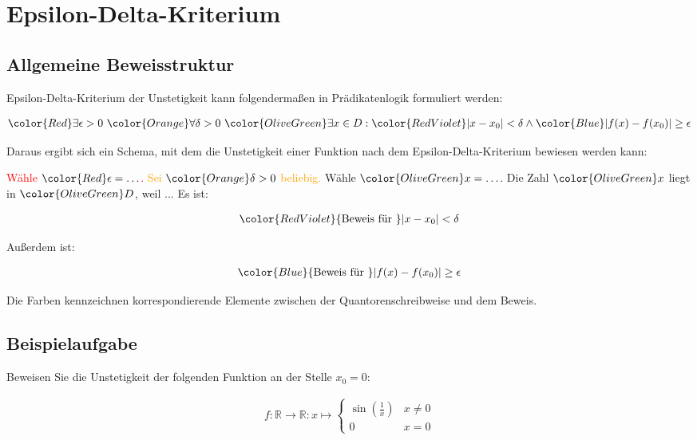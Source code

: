 \documentclass[fontsize=9pt,
               parskip=half-,
               DIV=14,
               listof=chapterentry,
               tocflat]{scrbook}
\begin{document}
\section{Epsilon-Delta-Kriterium}

\subsection{Allgemeine Beweisstruktur}

Epsilon-Delta-Kriterium der Unstetigkeit kann folgendermaßen in Prädikatenlogik formuliert werden:

\begin{align*}
{\color {Red}\exists \epsilon >0}\ {\color {Orange}\forall \delta >0}\ {\color {OliveGreen}\exists x\in D}:{\color {RedViolet}|x-x_{0}|<\delta }\land {\color {Blue}|f(x)-f(x_{0})|\geq \epsilon }
\end{align*}

Daraus ergibt sich ein Schema, mit dem die Unstetigkeit einer Funktion nach dem Epsilon-Delta-Kriterium bewiesen werden kann:

\begin{importantparagraph*}
{\textcolor{Red}{Wähle ${\color {Red}\epsilon =\ldots }$.}} {\textcolor{Orange}{Sei ${\color {Orange}\delta >0}$ beliebig.}} {\textcolor{OliveGreen}{Wähle ${\color {OliveGreen}x=\ldots }$. Die Zahl ${\color {OliveGreen}x}$ liegt in ${\color {OliveGreen}D}$, weil ...}} {\textcolor{RedViolet}{Es ist:}}

\begin{align*}
{\color {RedViolet}{\text{Beweis für }}|x-x_{0}|<\delta }
\end{align*}

Außerdem ist:

\begin{align*}
{\color {Blue}{\text{Beweis für }}|f(x)-f(x_{0})|\geq \epsilon }
\end{align*}

\end{importantparagraph*}

Die Farben kennzeichnen korrespondierende Elemente zwischen der Quantorenschreibweise und dem Beweis.

\subsection{Beispielaufgabe}

\begin{exercise*}
Beweisen Sie die Unstetigkeit der folgenden Funktion an der Stelle $x_{0}=0$:

\begin{align*}
f:\mathbb {R} \to \mathbb {R} :x\mapsto {\begin{cases}\sin \left({\frac {1}{x}}\right)&x\neq 0\\0&x=0\end{cases}}
\end{align*}

\end{exercise*}
\end{document}

